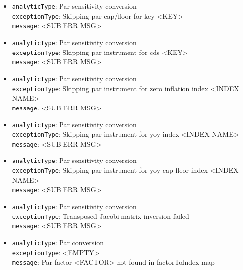 \begin{itemize}
  \item \lstinline!analyticType!: Par sensitivity conversion \\
        \lstinline!exceptionType!: Skipping par cap/floor for key <KEY> \\
        \lstinline!message!: <SUB ERR MSG>

  \item \lstinline!analyticType!: Par sensitivity conversion \\
        \lstinline!exceptionType!: Skipping par instrument for cds <KEY> \\
        \lstinline!message!: <SUB ERR MSG>

  \item \lstinline!analyticType!: Par sensitivity conversion \\
        \lstinline!exceptionType!: Skipping par instrument for zero inflation index <INDEX NAME> \\
        \lstinline!message!: <SUB ERR MSG>

  \item \lstinline!analyticType!: Par sensitivity conversion \\
        \lstinline!exceptionType!: Skipping par instrument for yoy index <INDEX NAME> \\
        \lstinline!message!: <SUB ERR MSG>

  \item \lstinline!analyticType!: Par sensitivity conversion \\
        \lstinline!exceptionType!: Skipping par instrument for yoy cap floor index <INDEX NAME> \\
        \lstinline!message!: <SUB ERR MSG>

  \item \lstinline!analyticType!: Par sensitivity conversion \\
        \lstinline!exceptionType!: Transposed Jacobi matrix inversion failed \\
        \lstinline!message!: <SUB ERR MSG>

  \item \lstinline!analyticType!: Par conversion \\
        \lstinline!exceptionType!: <EMPTY> \\
        \lstinline!message!: Par factor <FACTOR> not found in factorToIndex map

  \ifdefined\UserGuide
  \else
    
  \fi
\end{itemize}

